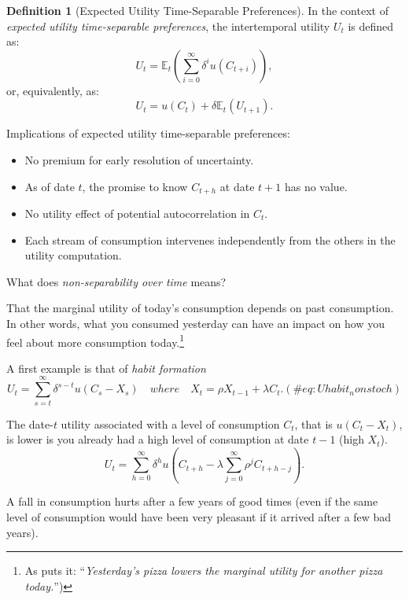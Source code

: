 \documentclass[
  12pt,
]{book}
\providecommand{\tightlist}{%
  \setlength{\itemsep}{0pt}\setlength{\parskip}{0pt}}
\theoremstyle{definition}
\newtheorem{definition}{Definition}[chapter]
\theoremstyle{definition}
\theoremstyle{definition}
\theoremstyle{definition}
\theoremstyle{remark}
\begin{document}
\begin{definition}[Expected Utility Time-Separable Preferences]
\protect\hypertarget{def:EUTSpref}{}\label{def:EUTSpref}In the context of \emph{expected utility time-separable preferences}, the intertemporal utility \(U_t\) is defined as:
\[
U_t = \mathbb{E}_t\left(\sum_{i=0}^{\infty} \delta^{i}u(C_{t+i})\right),
\]
or, equivalently, as:
\[
U_t = u(C_t) + \delta \mathbb{E}_t\left(U_{t+1}\right).
\]
\end{definition}

Implications of expected utility time-separable preferences:

\begin{itemize}
\tightlist
\item
  No premium for early resolution of uncertainty.
\item
  As of date \(t\), the promise to know \(C_{t+h}\) at date \(t+1\) has no value.
\item
  No utility effect of potential autocorrelation in \(C_t\).
\item
  Each stream of consumption intervenes independently from the others in the utility computation.
\end{itemize}

What does \emph{non-separability over time} means?

That the marginal utility of today's consumption depends on past consumption. In other words, what you consumed yesterday can have an impact on how you feel about more consumption today.\footnote{As \citet{Cochrane_2005} puts it: ``\emph{Yesterday's pizza lowers the marginal utility for another pizza today.}'')}

A first example is that of \emph{habit formation} \citep{Campbell_Shiller_1999}
\begin{equation}
U_t = \sum_{s=t}^{\infty} \delta^{s-t} u(C_s - X_s) \quad where \quad X_t = \rho X_{t-1} + \lambda C_t.(\#eq:Uhabit_nonstoch)
\end{equation}

The date-\(t\) utility associated with a level of consumption \(C_t\), that is \(u(C_t - X_t)\), is lower is you already had a high level of consumption at date \(t-1\) (high \(X_t\)).
\[
U_t = \sum_{h=0}^{\infty} \delta^{h}u\left(C_{t+h} - \lambda \sum_{j=0}^\infty \rho^j C_{t+h-j}\right).
\]

A fall in consumption hurts after a few years of good times (even if the same level of consumption would have been very pleasant if it arrived after a few bad years).
\end{document}
